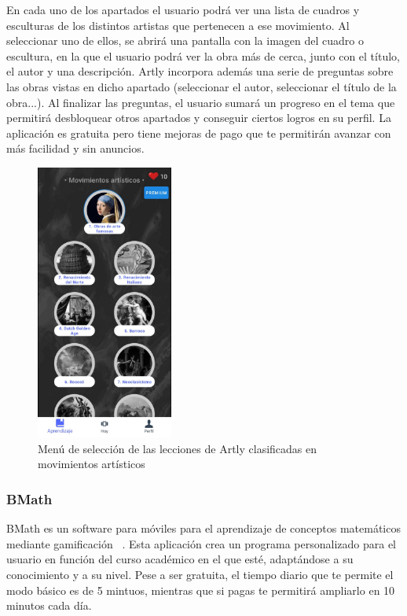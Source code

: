 En cada uno de los apartados el usuario podrá ver una lista de cuadros y esculturas de los distintos artistas que pertenecen a ese movimiento.
Al seleccionar uno de ellos, se abrirá una pantalla con la imagen del cuadro o escultura, en la que el usuario podrá ver la obra más de cerca, junto
con el título, el autor y una descripción. 
Artly incorpora además una serie de preguntas sobre las obras vistas en dicho apartado (seleccionar el autor, seleccionar el título de la obra...). 
Al finalizar las preguntas, el usuario sumará un progreso en el tema que permitirá desbloquear otros apartados y conseguir ciertos logros en su perfil.
La aplicación es gratuita pero tiene mejoras de pago que te permitirán avanzar con más facilidad y sin anuncios.

\begin{figure}[H]

    \centering
    \includegraphics[width=0.4\textwidth]{imagenes/c2/artly.jpeg}
    \caption{Menú de selección de las lecciones de Artly clasificadas en movimientos artísticos}
    \label{fig:artly}

\end{figure}



\subsubsection{BMath}
BMath es un software para móviles para el aprendizaje de conceptos matemáticos mediante gamificación ~\cite{bmath}. Esta aplicación crea un programa personalizado para el
usuario en función del curso académico en el que esté, adaptándose a su conocimiento y a su nivel. Pese a ser gratuita, el tiempo diario que te permite el
modo básico es de 5 mintuos, mientras que si pagas te permitirá ampliarlo en 10 minutos cada día. 


